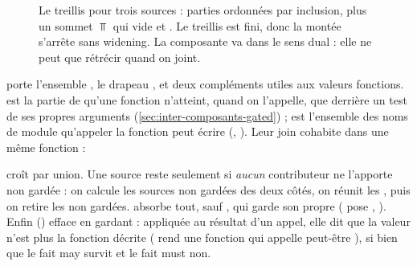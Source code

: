 \begin{figure}[htbp]\centering
{}
\caption{Le treillis  pour trois sources : parties ordonnées par inclusion, plus un
sommet $\Top$ qui vide  et . Le treillis est fini, donc la montée
s'arrête sans widening. La composante  va dans le sens dual : elle ne peut que
rétrécir quand on joint.}
\label{fig:inter-composants-deps}
\end{figure}


 porte l'ensemble , le drapeau , et deux compléments utiles aux
valeurs fonctions.  est la partie de  qu'une fonction n'atteint, quand on
l'appelle, que derrière un test de ses propres arguments (\cref{sec:inter-composants-gated}) ;
 est l'ensemble des noms de module qu'appeler la fonction peut écrire
(, ). Leur join cohabite
dans une même fonction :


 croît par union. Une source reste  seulement si \emph{aucun}
contributeur ne l'apporte non gardée : on calcule les sources non gardées des deux côtés, on
réunit les , puis on retire les non gardées.  absorbe tout, sauf
, qui garde son propre  ( pose
, ). Enfin
 () efface  en gardant
 : appliquée au résultat d'un appel, elle dit que la valeur n'est plus la fonction
décrite ( rend une fonction qui appelle peut-être ), si bien que le
fait may survit et le fait must non.

